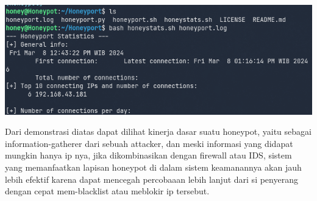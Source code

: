 \documentclass[12pt, a4paper]{article}
\begin{document}
  \begin{center}
    \includegraphics[scale=0.5]{LOGOUTPUT}
  \end{center}

  Dari demonstrasi diatas dapat dilihat kinerja dasar suatu honeypot, yaitu sebagai
  information-gatherer dari sebuah attacker, dan meski informasi yang didapat mungkin
  hanya ip nya, jika dikombinasikan dengan firewall atau IDS, sistem yang memanfaatkan
  lapisan honeypot di dalam sistem keamanannya akan jauh lebih efektif karena
  dapat mencegah percobaaan lebih lanjut dari si penyerang dengan cepat mem-blacklist
  atau meblokir ip tersebut.
\end{document}
